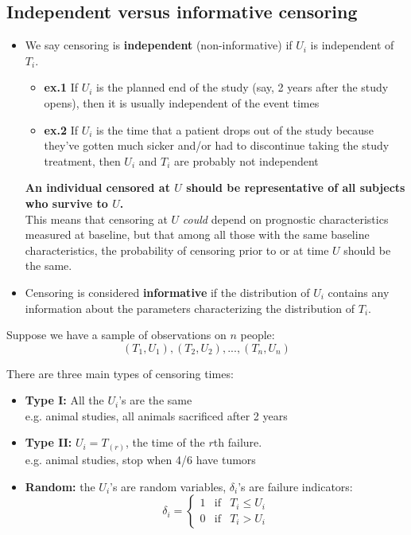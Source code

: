 \documentclass[11pt,slidesonly,semrot,portrait,palatino]{book}
\begin{document}
\subsection{Independent versus informative censoring}

\begin{itemize}
\item We say censoring is {\bf independent} (non-informative)
if $U_i$ is independent of $T_i$.
\begin{itemize}
\item {\bf ex.1} If $U_i$ is the planned end of the study (say, 2
years after the study opens), then it is usually independent of the
event times

\item {\bf ex.2} If $U_i$ is the time that a patient drops out of the study
because they've gotten much sicker and/or had to discontinue taking
the study treatment, then $U_i$ and $T_i$ are probably not independent
\end{itemize}
{\bf An individual censored at $U$ should be representative of all subjects
who survive to $U$.}
\\[2ex]
This means that censoring at $U$ {\em could} depend
on prognostic characteristics measured at baseline, but that among
all those with the same baseline characteristics, the probability
of censoring prior to or at time $U$ should be the same.

\item Censoring is considered {\bf informative} if the
distribution of $U_i$ contains any information about the parameters
characterizing the distribution of $T_i$.
\end{itemize}
Suppose we have a sample of observations on $n$ people:
$$(T_1,U_1), (T_2,U_2),..., (T_n,U_n)$$


There are three main types of censoring times:
\begin{itemize}
\item {\bf Type I:}  All the $U_i$'s are the same \\
e.g. animal studies, all animals sacrificed after 2 years \\
\item {\bf Type II:}  $U_i = T_{(r)} $, the time of the $r$th failure.\\
e.g. animal studies, stop when 4/6 have tumors\\
\item  {\bf Random:} the $U_i$'s are random variables, $\delta_i$'s are
failure indicators:
\[\delta_i=\left\{\begin{array}{ccc}
1 & \mbox{if} & T_i\le U_i\\
0 & \mbox{if} & T_i>U_i
\end{array} \right. \]
\end{itemize}
\end{document}

